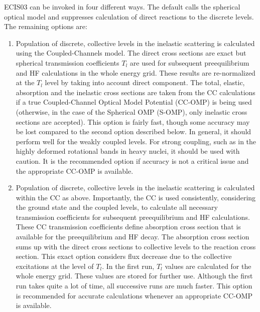\documentclass[twocolumn,amsmath,amssymb,10pt,groupedaddress,a4paper]{revtex4}
\begin{document}
ECIS03 can be invoked in four different ways. The default  calls
the spherical optical model and suppresses calculation of direct reactions
to the discrete levels. The remaining options are:

\begin{enumerate}
\item  Population of discrete, collective levels in the inelastic
scattering is calculated using the Coupled-Channels
model. The direct cross sections are exact but spherical transmission
coefficients $T_{l}$ are used for subsequent preequilibrium and HF
calculations in the whole energy grid. These results are re-normalized
at the $T_{l}$ level by taking into account direct component. The
total, elastic, absorption and the inelastic cross sections are taken
from the CC calculations if a true Coupled-Channel Optical Model Potential
(CC-OMP) is being used (otherwise, in the case of the Spherical OMP
(S-OMP), only inelastic cross sections are accepted).
This option is fairly fast, though some accuracy may be lost
compared to the second option described below. In general, it should
perform well for the weakly coupled levels. For strong coupling, such
as in the highly deformed rotational bands in heavy nuclei, it should
be used with caution. It is the recommended option if accuracy is
not a critical issue and the appropriate CC-OMP is available.

\item Population of discrete, collective levels in the inelastic
scattering is calculated within the CC as above. Importantly, the
CC is used consistently, considering the ground state and the coupled
levels, to calculate all necessary transmission coefficients for subsequent
preequilibrium and HF calculations. These
CC transmission coefficients define absorption cross section that
is available for the preequilibrium and HF decay. The absorption cross
section sums up with the direct cross sections to collective levels
to the reaction cross section. This exact option considers
flux decrease due to the collective excitations at the level of $T_{l}$.
In the first run, $T_{l}$ values are calculated for
the whole energy grid. These values are stored
for further use. Although the first run takes quite a lot of time,
all successive runs are much faster. This option is recommended
for accurate calculations whenever an appropriate CC-OMP is
available.


\end{enumerate}
\end{document}
